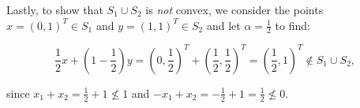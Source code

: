 \begin{solution}
  Lastly, to show that $S_1 \cup S_2$ is \textit{not} convex, we consider the points $x = (0, 1)^T \in S_1$ and 
  $y = (1, 1)^T \in S_2$ and let $\alpha = \frac{1}{2}$ to find:

  $$
  \frac{1}{2}x + \left(1 - \frac{1}{2}\right)y = \left(0, \frac{1}{2}\right)^T + \left(\frac{1}{2}, \frac{1}{2}\right)^T
                                               = \left(\frac{1}{2}, 1\right)^T \notin S_1 \cup S_2,
  $$

  since $x_1 + x_2 = \frac{1}{2} + 1 \nleq 1$ and $-x_1 + x_2 = -\frac{1}{2} + 1 = \frac{1}{2} \nleq 0$.

  \ \\
\end{solution}